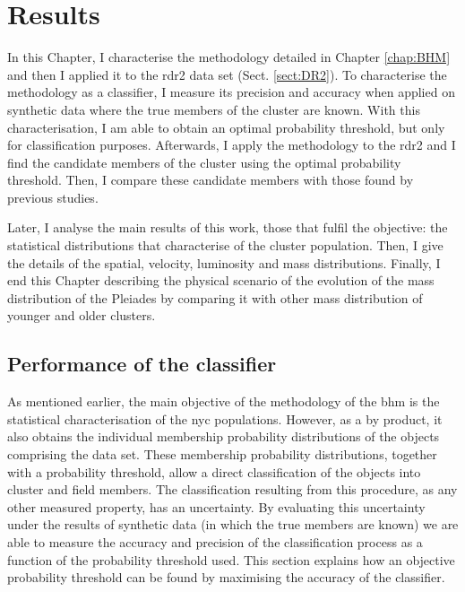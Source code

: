 \chapter{Results}
\label{chap:Results}
In this Chapter, I characterise the methodology detailed in Chapter  \ref{chap:BHM} and then I applied it to the \gls{rdr2} data set (Sect. \ref{sect:DR2}). To characterise the methodology as a classifier, I measure its precision and accuracy when applied on synthetic data where the true members of the cluster are known. With this characterisation, I am able to obtain an optimal probability threshold, but only for classification purposes. Afterwards, I apply the methodology to the \gls{rdr2} and I find the candidate members of the cluster using the optimal probability threshold. Then, I compare these candidate members with those found by previous studies.

Later, I analyse the main results of this work, those that fulfil the objective: the statistical distributions that characterise of the cluster population. Then, I give the details of the spatial, velocity, luminosity and mass distributions. Finally, I end this Chapter describing the physical scenario of the evolution of the mass distribution of the Pleiades by comparing it with other mass distribution of younger and older clusters.

\section{Performance of the classifier}
\label{sect:classifier}
As mentioned earlier, the main objective of the methodology of the \gls{bhm} is the statistical characterisation of the \gls{nyc} populations. However, as a by product, it also obtains the individual membership probability distributions of the objects comprising the data set. These membership probability distributions, together with a probability threshold, allow a direct classification of the objects into cluster and field members.  The classification resulting from this procedure, as any other measured property, has an uncertainty. By evaluating this uncertainty under the results of synthetic data (in which the true members are known) we are able to measure the accuracy and precision of the classification process as a function of the probability threshold used. This section explains how an objective probability threshold can be found by maximising the accuracy of the classifier. 

